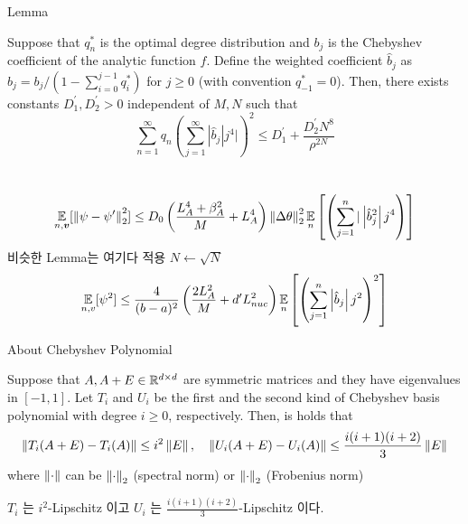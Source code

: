 \documentclass[9pt,t,aspectratio=169]{beamer}
\begin{document}
\begin{frame}{Lemma}
\begin{lemma}
    Suppose that $q_n^*$ is the optimal degree distribution and $b_j$ is the Chebyshev coefficient of the analytic function $f$. Define the weighted coefficient $\hat{b}_j$ as $\hat{b}_j = b_j / (1- \sum_{i=0}^{j-1} q_i^*)$ for $j \geq 0$ (with convention $q_{-1}^* =0 $). Then, there exists constants $D_1^{\prime}, D_2^{\prime} > 0 $ independent of $M,N$ such that 
    \begin{equation*}
        \sum_{n=1}^{\infty} q_n \left( \sum_{j=1}^{\infty} |\hat{b}_j| j^4| \right)^2 \leq D_1^{\prime} + \frac{D_2^{\prime} N^8}{\rho^{2N}}
    \end{equation*}
\end{lemma}
 \\ 
\begin{equation*}
    \mathop{\mathbb{E} \displaystyle}_{n, {\bm{v}}} [ \left\lVert\psi - \psi^{\prime}\right\rVert_2^2 ] \leq D_0 \left( \frac{L_A^4 + \beta_A^2}{M} + L_A^4 \right) \left\lVert\Delta \theta\right\rVert_2^2 \mathop{\mathbb{E} \displaystyle}_n \left[ \left( \sum_{j=1}^{n} |\left|\hat{b}_j^2\right| j^4 \right) \right]
\end{equation*} 
비슷한 Lemma는 여기다 적용 $N \gets \sqrt{N}$
\begin{equation*}
    \mathop{\mathbb{E} \displaystyle}_{n,v} [\psi^2] \leq \frac{4}{(b-a)^2} \left( \frac{2 L_A^2}{M} + d^{\prime} L_{nuc}^2 \right) \mathop{\mathbb{E} \displaystyle}_n \left[ \left( \sum_{j=1}^n \left|\hat{b}_j\right| j^2 \right)^2 \right]
\end{equation*}
\end{frame}
\begin{frame}{About Chebyshev Polynomial}
\begin{lemma}
    Suppose that $A, A+E \in \mathbb{R}^{d \times d}$ are symmetric matrices and they have eigenvalues in $[-1,1]$. Let $T_i$ and $U_i$ be the first and the second kind of Chebyshev basis polynomial with degree $i \geq 0$, respectively. Then, is holds that 
    \begin{equation*}
        \left\lVert T_i (A+E) - T_i (A)\right\rVert \leq i^2 \left\lVert E\right\rVert, \quad \left\lVert U_i (A+E) - U_i (A)\right\rVert \leq \frac{i (i+1) (i+2) }{3} \left\lVert E\right\rVert
    \end{equation*}
    where $\left\lVert\cdot\right\rVert$ can be $\left\lVert\cdot\right\rVert_2$ (spectral norm) or $\left\lVert\cdot\right\rVert_2$ (Frobenius norm) 
\end{lemma}
$T_i$ 는 $i^2$-Lipschitz 이고 $U_i$ 는 $\frac{i (i+1)(i+2)}{3}$-Lipschitz 이다. 
\end{frame}
\end{document}
